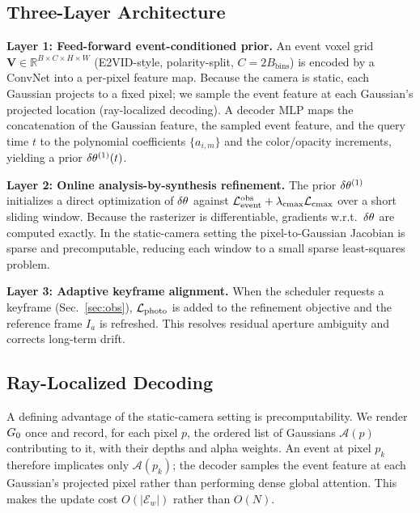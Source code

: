 \subsection{Three-Layer Architecture}
\label{sec:arch}

\noindent\textbf{Layer 1: Feed-forward event-conditioned prior.}
An event voxel grid $\mathbf{V}\in\mathbb{R}^{B\times C\times H\times W}$ (E2VID-style, polarity-split, $C{=}2B_{\text{bins}}$) is encoded by a ConvNet into a per-pixel feature map. Because the camera is static, each Gaussian projects to a fixed pixel; we sample the event feature at each Gaussian's projected location (ray-localized decoding). A decoder MLP maps the concatenation of the Gaussian feature, the sampled event feature, and the query time $t$ to the polynomial coefficients $\{a_{i,m}\}$ and the color/opacity increments, yielding a prior $\delta\theta^{(1)}(t)$.

\noindent\textbf{Layer 2: Online analysis-by-synthesis refinement.}
The prior $\delta\theta^{(1)}$ initializes a direct optimization of $\delta\theta$ against $\mathcal{L}_{\text{event}}^{\text{obs}} + \lambda_{\text{cmax}}\mathcal{L}_{\text{cmax}}$ over a short sliding window. Because the rasterizer is differentiable, gradients w.r.t.\ $\delta\theta$ are computed exactly. In the static-camera setting the pixel-to-Gaussian Jacobian is sparse and precomputable, reducing each window to a small sparse least-squares problem.

\noindent\textbf{Layer 3: Adaptive keyframe alignment.}
When the scheduler requests a keyframe (Sec.~\ref{sec:obs}), $\mathcal{L}_{\text{photo}}$ is added to the refinement objective and the reference frame $I_a$ is refreshed. This resolves residual aperture ambiguity and corrects long-term drift.

\subsection{Ray-Localized Decoding}
A defining advantage of the static-camera setting is precomputability. We render $G_0$ once and record, for each pixel $p$, the ordered list of Gaussians $\mathcal{A}(p)$ contributing to it, with their depths and alpha weights. An event at pixel $p_k$ therefore implicates only $\mathcal{A}(p_k)$; the decoder samples the event feature at each Gaussian's projected pixel rather than performing dense global attention. This makes the update cost $O(|\mathcal{E}_w|)$ rather than $O(N)$.

